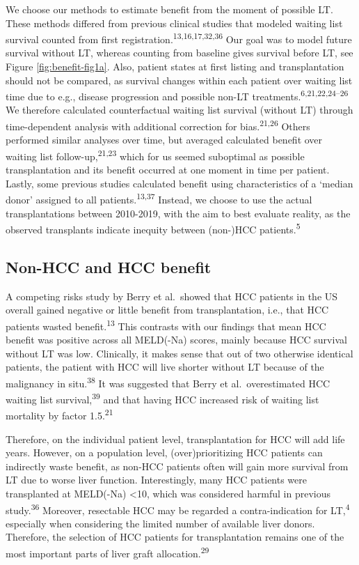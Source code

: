 \documentclass[11pt,english,]{book} %
\begin{document}
We choose our methods to estimate benefit from the moment of possible LT. These methods differed from previous clinical studies that modeled waiting list survival counted from first registration.\textsuperscript{13,16,17,32,36} Our goal was to model future survival without LT, whereas counting from baseline gives survival before LT, see Figure \ref{fig:benefit-fig1a}. Also, patient states at first listing and transplantation should not be compared, as survival changes within each patient over waiting list time due to e.g., disease progression and possible non-LT treatments.\textsuperscript{6,21,22,24--26} We therefore calculated counterfactual waiting list survival (without LT) through time-dependent analysis with additional correction for bias.\textsuperscript{21,26} Others performed similar analyses over time, but averaged calculated benefit over waiting list follow-up,\textsuperscript{21,23} which for us seemed suboptimal as possible transplantation and its benefit occurred at one moment in time per patient. Lastly, some previous studies calculated benefit using characteristics of a `median donor' assigned to all patients.\textsuperscript{13,37} Instead, we choose to use the actual transplantations between 2010-2019, with the aim to best evaluate reality, as the observed transplants indicate inequity between (non-)HCC patients.\textsuperscript{5}

\hypertarget{non-hcc-and-hcc-benefit}{%
\subsection*{Non-HCC and HCC benefit}\label{non-hcc-and-hcc-benefit}}

A competing risks study by Berry et al.~showed that HCC patients in the US overall gained negative or little benefit from transplantation, i.e., that HCC patients wasted benefit.\textsuperscript{13} This contrasts with our findings that mean HCC benefit was positive across all MELD(-Na) scores, mainly because HCC survival without LT was low. Clinically, it makes sense that out of two otherwise identical patients, the patient with HCC will live shorter without LT because of the malignancy in situ.\textsuperscript{38} It was suggested that Berry et al.~overestimated HCC waiting list survival,\textsuperscript{39} and that having HCC increased risk of waiting list mortality by factor 1.5.\textsuperscript{21}

Therefore, on the individual patient level, transplantation for HCC will add life years. However, on a population level, (over)prioritizing HCC patients can indirectly waste benefit, as non-HCC patients often will gain more survival from LT due to worse liver function. Interestingly, many HCC patients were transplanted at MELD(-Na) \textless10, which was considered harmful in previous study.\textsuperscript{36} Moreover, resectable HCC may be regarded a contra-indication for LT,\textsuperscript{4} especially when considering the limited number of available liver donors. Therefore, the selection of HCC patients for transplantation remains one of the most important parts of liver graft allocation.\textsuperscript{29}
\end{document}
